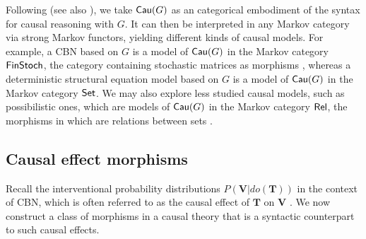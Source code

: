 \documentclass[12pt]{amsart}
\theoremstyle{plain}
\theoremstyle{definition}
\theoremstyle{remark}
\numberwithin{equation}{section}
\theoremstyle{plain}
\newcommand{\0}{\emptyset}
\newcommand{\cat}[1]{\textup{\textsf{#1}}}
\DeclareMathOperator{\cau}{\sf{Cau}}
\begin{document}
Following \cite{Fong:thesis} (see also \cite{jacobs2019causal}), we take $\cau(G)$ as an categorical embodiment of the syntax for causal reasoning with $G$. It can then be interpreted in any Markov category via strong Markov functors, yielding different kinds of causal models. For example, a CBN based on $G$ is a model of $\cat{Cau}(G)$ in the Markov category $\cat{FinStoch}$, the category containing stochastic matrices as morphisms \cite{ Fong:thesis, fritz2020synthetic, jacobs2019causal}, whereas a deterministic structural equation model based on $G$ is a model of $\cat{Cau}(G)$ in the Markov category $\cat{Set}$. We may also explore less studied causal models, such as possibilistic ones, which are models of $\cat{Cau}(G)$ in the Markov category $\cat{Rel}$, the morphisms in which are relations between sets \cite{Fong:thesis}.

\subsection{Causal effect morphisms}
\label{subsec:effect}

Recall the interventional probability distributions $P(\mathbf{V}|do(\mathbf{T}))$ in the context of CBN, which is often referred to as the causal effect of $\mathbf{T}$ on $\mathbf{V}$ \cite{tian2002general}. We now construct a class of morphisms in a causal theory that is a syntactic counterpart to such causal effects.
\end{document}
